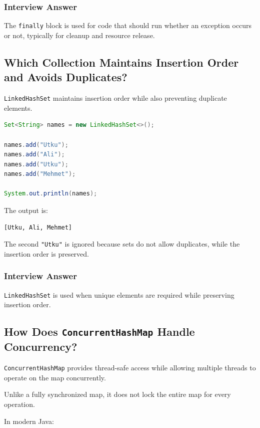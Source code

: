 \documentclass[12pt,a4paper]{article}
\begin{document}
\subsubsection*{Interview Answer}

The \texttt{finally} block is used for code that should run whether an
exception occurs or not, typically for cleanup and resource release.

\subsection{Which Collection Maintains Insertion Order and Avoids Duplicates?}

\texttt{LinkedHashSet} maintains insertion order while also preventing
duplicate elements.

\begin{lstlisting}[language=Java]
Set<String> names = new LinkedHashSet<>();

names.add("Utku");
names.add("Ali");
names.add("Utku");
names.add("Mehmet");

System.out.println(names);
\end{lstlisting}

The output is:

\begin{verbatim}
[Utku, Ali, Mehmet]
\end{verbatim}

The second \texttt{"Utku"} is ignored because sets do not allow duplicates,
while the insertion order is preserved.

\subsubsection*{Interview Answer}

\texttt{LinkedHashSet} is used when unique elements are required while
preserving insertion order.

\subsection{How Does \texttt{ConcurrentHashMap} Handle Concurrency?}

\texttt{ConcurrentHashMap} provides thread-safe access while allowing
multiple threads to operate on the map concurrently.

Unlike a fully synchronized map, it does not lock the entire map for every
operation.

In modern Java:
\end{document}
